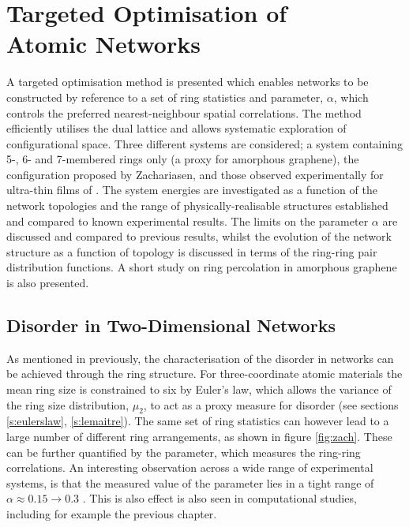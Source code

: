 \chapter[Targeted Optimisation of Atomic Networks]{Targeted Optimisation of \\ Atomic Networks}
\label{ch:targetedopt}

\begin{chapterabstract}
A targeted optimisation method is presented which enables \td{} networks to be constructed by reference to a set of ring statistics and \aw{} parameter, $\alpha$, which controls the preferred nearest\--neighbour spatial correlations.
The method efficiently utilises the dual lattice and allows systematic exploration of configurational space. 
Three different systems are considered; a system containing 5\--, 6\-- and 7\--membered rings only (a proxy for amorphous graphene), the configuration proposed by Zachariasen, and those
observed experimentally for ultra\--thin films of \sioii. 
The system energies are investigated as a function of the network topologies and the range of physically\--realisable structures established and compared to known experimental results.
The limits on the parameter $\alpha$ are discussed and compared to previous results, whilst the evolution of the network structure as a function of topology is discussed in terms of the ring\--ring pair distribution functions.
A short study on ring percolation in amorphous graphene is also presented.
\end{chapterabstract}


\section{Disorder in Two\--Dimensional Networks}

As mentioned in previously, the characterisation of the disorder in \td{} networks can be achieved through the ring structure. 
For three\--coordinate atomic materials the mean ring size is constrained to six by Euler's law, which allows the variance of the ring size distribution, $\mu_2$, to act as a proxy measure for disorder (see sections \ref{s:eulerslaw}, \ref{s:lemaitre}).
The same set of ring statistics can however lead to a large number of different ring arrangements, as shown in figure \ref{fig:zach}.
These can be further quantified by the \aw{} parameter, which measures the ring\--ring correlations.
An interesting observation across a wide range of experimental systems, is that the measured value of the \aw{} parameter lies in a tight range of $\alpha\approx0.15\rightarrow 0.3$ \cite{Zsoldos1999}.
This is also effect is also seen in computational studies, including for example the previous chapter.

